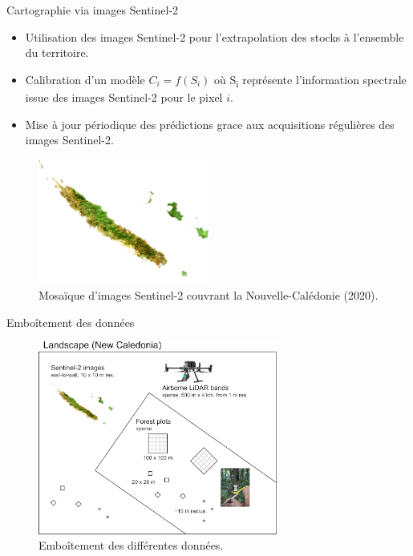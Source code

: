 \documentclass[10pt,table,dvipsnames,compress]{beamer}
\begin{document}
\begin{frame}[label={sec:org66b2767}]{Cartographie via images Sentinel-2}
\begin{itemize}
\item Utilisation des images Sentinel-2 pour l'extrapolation des stocks à l'ensemble du territoire.
\item Calibration d'un modèle \(C_i=f(S_i)\) où S\textsubscript{i} représente l'information spectrale issue des images Sentinel-2 pour le pixel \(i\).
\item Mise à jour périodique des prédictions grace aux acquisitions régulières des images Sentinel-2.
\end{itemize}

\begin{figure}[htbp]
\centering
\includegraphics[width=0.5\textwidth]{figs/newcal-S2.png}
\caption{Mosaïque d'images Sentinel-2 couvrant la Nouvelle-Calédonie (2020).}
\end{figure}
\end{frame}

\begin{frame}[label={sec:orgf85887e}]{Emboîtement des données}
\begin{figure}[htbp]
\centering
\includegraphics[width=0.7\textwidth]{figs/data-sources.png}
\caption{Emboîtement des différentes données.}
\end{figure}
\end{frame}
\end{document}
